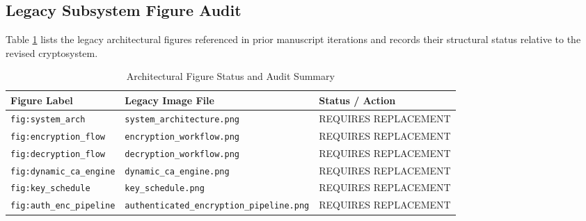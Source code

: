 \subsection{Legacy Subsystem Figure Audit}
\label{subsec:figure_audit}
Table \ref{tab:figure_audit} lists the legacy architectural figures referenced in prior manuscript iterations and records their structural status relative to the revised cryptosystem.

\begin{table}[htbp]
\caption{Architectural Figure Status and Audit Summary}
\label{tab:figure_audit}
\centering
\begin{tabular}{lll}
\hline
\textbf{Figure Label} & \textbf{Legacy Image File} & \textbf{Status / Action} \\
\hline
\texttt{fig:system_arch} & \texttt{system_architecture.png} & REQUIRES REPLACEMENT \\
\texttt{fig:encryption_flow} & \texttt{encryption_workflow.png} & REQUIRES REPLACEMENT \\
\texttt{fig:decryption_flow} & \texttt{decryption_workflow.png} & REQUIRES REPLACEMENT \\
\texttt{fig:dynamic_ca_engine} & \texttt{dynamic_ca_engine.png} & REQUIRES REPLACEMENT \\
\texttt{fig:key_schedule} & \texttt{key_schedule.png} & REQUIRES REPLACEMENT \\
\texttt{fig:auth_enc_pipeline} & \texttt{authenticated_encryption_pipeline.png} & REQUIRES REPLACEMENT \\
\hline
\end{tabular}
\end{table}

